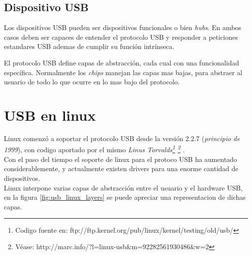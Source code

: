 \subsection{Dispositivo USB}

Los dispositivos USB pueden ser dispositivos funcionales o bien \emph{hubs}.
En ambos casos deben ser capaces de entender el protocolo USB y responder a
peticiones estandares USB ademas de cumplir su funci\'on intr\'inseca. 



El protocolo USB define capas de abstracci\'on, cada cual con una funcionalidad
espec\'ifica. Normalmente los \emph{chips} manejan las capas mas bajas, para
abstraer al usuario de todo lo que ocurre en lo mas bajo del protocolo.\\






\section{USB en linux}

Linux comenz\'o a soportar el protocolo USB desde la versi\'on 2.2.7
(\emph{principio de 1999}), con codigo aportado por el mismo \emph{Linus
Torvalds\footnote{Codigo fuente
en: ftp://ftp.kernel.org/pub/linux/kernel/testing/old/usb/}
\footnote{V\'ease:
http://marc.info/?l=linux-usb\&m=92282561930486\&w=2}
}.\\

Con el paso del tiempo el soporte de linux para el protoco USB ha aumentado
considerablemente, y actualmente existen drivers para una enorme cantidad de
dispositivos.\\

Linux interpone varias capas de abstracci\'on entre el usuario y el hardware
USB, en la figura \ref{fig:usb_linux_layers} se puede apreciar una
representacion de dichas capas.

